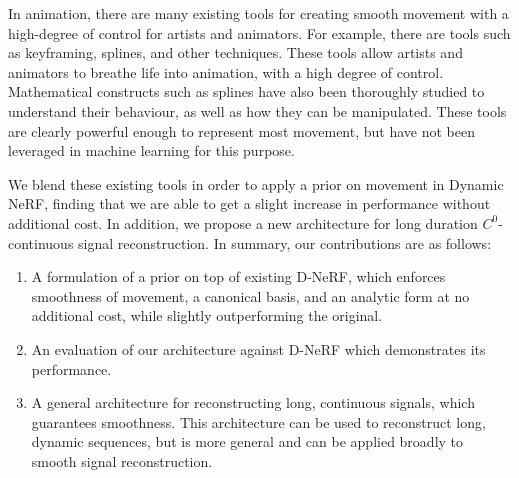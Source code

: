 In animation, there are many existing tools for creating smooth movement with a high-degree of
control for artists and animators. For example, there are tools such as keyframing, splines,
and other techniques. These tools allow artists and animators to breathe life into animation,
with a high degree of control. Mathematical constructs such as splines have also been thoroughly
studied to understand their behaviour, as well as how they can be manipulated. These tools are
clearly powerful enough to represent most movement, but have not been leveraged in machine
learning for this purpose.

We blend these existing tools in order to apply a prior on movement in Dynamic NeRF, finding that we are able to get a slight increase in performance without additional cost. In addition, we propose a new architecture for long duration $C^0$-continuous signal reconstruction. In summary, our contributions are as follows:

\begin{enumerate}
    \item A formulation of a prior on top of existing D-NeRF, which enforces smoothness of movement, a canonical basis, and an analytic form at no additional cost, while slightly outperforming the original.
    \item An evaluation of our architecture against D-NeRF which demonstrates its performance.
    \item A general architecture for reconstructing long, continuous signals, which guarantees smoothness. This architecture can be used to reconstruct long, dynamic sequences, but is more general and can be applied broadly to smooth signal reconstruction.
\end{enumerate}

